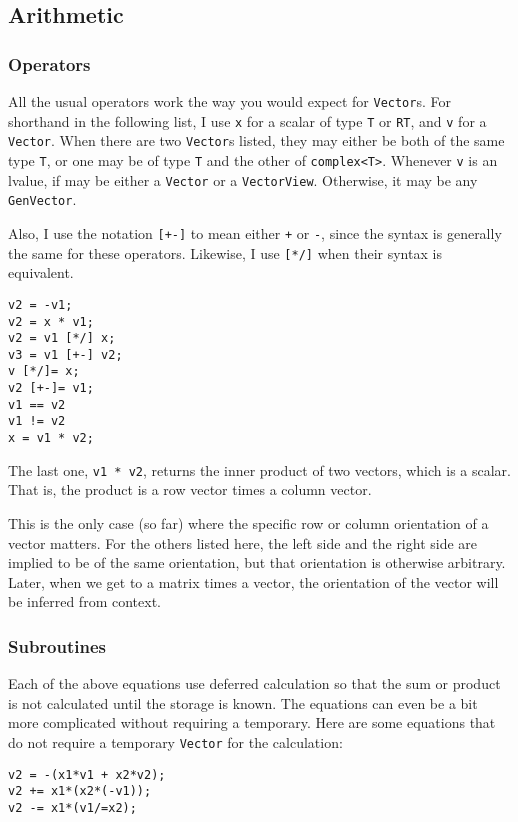 \documentclass[twoside,letterpaper,11pt]{article}
\renewcommand{\tt}[1]{{\texttt {#1}}}
\begin{document}
\subsection{Arithmetic}

\subsubsection{Operators}

All the usual operators work the way you would expect for \tt{Vector}s.  For shorthand in the 
following list, I use \tt{x} for a scalar of type \tt{T} or \tt{RT}, and
\tt{v} for a \tt{Vector}.  When there are two \tt{Vector}s
listed, they may either be both of the same type \tt{T}, or one may be of type 
\tt{T} and the other of \tt{complex<T>}.  Whenever \tt{v} is an lvalue,
if may be either a \tt{Vector} or a \tt{VectorView}.  Otherwise, it may be any \tt{GenVector}.

Also, I use the notation \tt{[+-]} to mean either \tt{+} or \tt{-}, since
the syntax is generally the same for these operators.
Likewise, I use \tt{[*/]} when their syntax is equivalent.

\begin{verbatim}
v2 = -v1;
v2 = x * v1;
v2 = v1 [*/] x;
v3 = v1 [+-] v2;
v [*/]= x;
v2 [+-]= v1;
v1 == v2
v1 != v2
x = v1 * v2;
\end{verbatim}
The last one, \tt{v1 * v2},
returns the inner product of two vectors, which is a scalar.  That is, the product
is a row vector times a column vector.  

This is the only case (so far)
where the specific row or column orientation of a vector matters.  For the others
listed here, the left side and the right side are implied to be of the same orientation, but
that orientation is otherwise arbitrary.
Later, when we get to a matrix times a vector, the orientation 
of the vector will be inferred from context.

\subsubsection{Subroutines}

Each of the above equations use deferred calculation so that the sum or product is not calculated
until the storage is known.  The equations can even be a bit more complicated without 
requiring a temporary.  Here are some equations that do not require a temporary 
\tt{Vector} for the calculation:

\begin{verbatim}
v2 = -(x1*v1 + x2*v2);
v2 += x1*(x2*(-v1));
v2 -= x1*(v1/=x2);
\end{verbatim}
\end{document}
